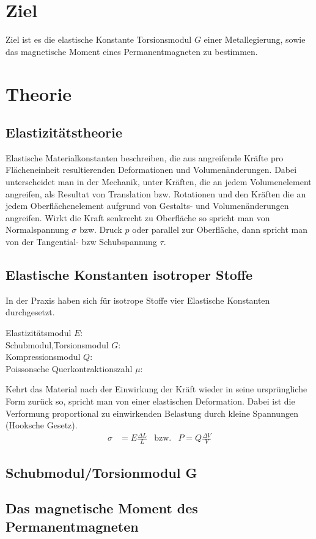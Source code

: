 \section{Ziel}
Ziel ist es die elastische Konstante Torsionsmodul $G$ einer Metallegierung, sowie das magnetische Moment eines Permanentmagneten zu bestimmen.


\section{Theorie}
\subsection{Elastizitätstheorie}
Elastische Materialkonstanten beschreiben, die aus angreifende Kräfte pro Flächeneinheit resultierenden Deformationen und Volumenänderungen.
Dabei unterscheidet man in der Mechanik, unter Kräften, die an jedem Volumenelement angreifen, als Resultat von Translation bzw. Rotationen und
den Kräften die an jedem Oberflächenelement aufgrund von Gestalts- und Volumenänderungen angreifen.
Wirkt die Kraft senkrecht zu Oberfläche so spricht man von Normalspannung $\sigma$ bzw. Druck $p$ oder parallel zur Oberfläche,
dann spricht man von der Tangential- bzw Schubspannung $\tau$.\\




\subsection{Elastische Konstanten isotroper Stoffe}
In der Praxis haben sich für isotrope Stoffe vier Elastische Konstanten durchgesetzt.\\
\begin{description}
\item[Elastizitätsmodul $E$:]


\item[Schubmodul,Torsionsmodul $G$:]
\item[Kompressionsmodul $Q$:]
\item[Poissonsche Querkontraktionszahl $\mu$:]
\end{description}


Kehrt das Material nach der Einwirkung der Kräft wieder in seine ursprüngliche Form zurück so, spricht man von einer elastischen Deformation.
Dabei ist die Verformung proportional zu einwirkenden Belastung durch kleine Spannungen (Hooksche Gesetz).
\begin{align}
    \sigma &= E  \frac{\Delta L}{L} & \mathrm{bzw.} & P=Q \frac{\Delta V}{V} 
\end{align}

\subsection{Schubmodul/Torsionmodul G}
\subsection{Das magnetische Moment des Permanentmagneten}
\label{sec:Theorie}
